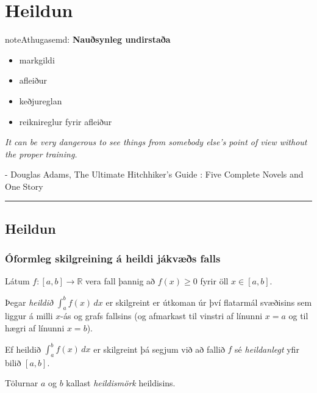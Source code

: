 \documentclass[a4paper,10pt,icelandic]{sphinxmanual}
\begin{document}
\chapter{Heildun}
\label{kafli06::doc}\label{kafli06:heildun}
\begin{notice}{note}{Athugasemd:}
\textbf{Nauðsynleg undirstaða}
\begin{itemize}
\item {} 
markgildi

\item {} 
afleiður

\item {} 
keðjureglan

\item {} 
reiknireglur fyrir afleiður

\end{itemize}
\end{notice}

\emph{It can be very dangerous to see things from somebody else's point of view without the proper training.}

- Douglas Adams, The Ultimate Hitchhiker's Guide : Five Complete Novels and One Story


\bigskip\hrule{}\bigskip



\section{Heildun}
\label{kafli06:id1}

\subsection{Óformleg skilgreining á heildi jákvæðs falls}
\label{kafli06:oformleg-skilgreining-a-heildi-jakvaes-falls}
Látum \(f:[a,b]\rightarrow {{\mathbb  R}}\) vera fall þannig að
\(f(x)\geq 0\) fyrir öll \(x\in[a,b]\).

Þegar \textit{heildið} \(\int_a^b f(x)\,dx\) er skilgreint er útkoman úr því
flatarmál svæðisins sem liggur á milli \(x\)-ás og grafs fallsins
(og afmarkast til vinstri af línunni \(x=a\) og til hægri af línunni
\(x=b\)).

Ef heildið \(\int_a^b f(x)\,dx\) er skilgreint þá segjum við að
fallið \(f\) sé \textit{heildanlegt} yfir bilið \([a,b]\).

Tölurnar \(a\) og \(b\) kallast \textit{heildismörk} heildisins.
\end{document}
